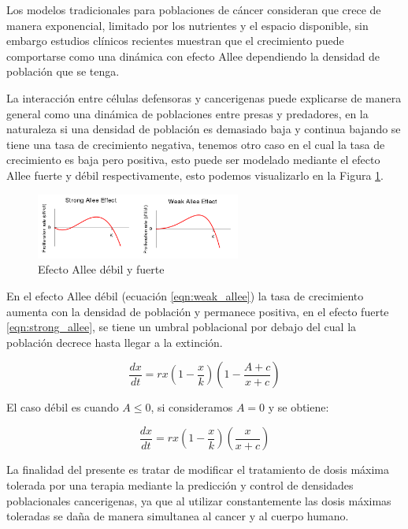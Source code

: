 \documentclass{article}
\begin{document}
Los modelos tradicionales para poblaciones de cáncer consideran que crece de manera exponencial, limitado por los nutrientes y el espacio disponible, sin embargo estudios clínicos recientes muestran que el crecimiento puede comportarse como una dinámica con efecto Allee dependiendo la densidad de población que se tenga\cite{Gerlee032022}.

La interacción entre células defensoras y cancerigenas puede explicarse de manera general como una dinámica de poblaciones entre presas y predadores, en la naturaleza si una densidad de población es demasiado baja y continua bajando se tiene una tasa de crecimiento negativa, tenemos otro caso en el cual la tasa de crecimiento es baja pero positiva, esto puede ser modelado mediante el efecto Allee fuerte y débil respectivamente, esto podemos visualizarlo en la Figura \ref{fig:allees}.


\begin{figure}[ht]
    \centering
    \includegraphics[width=0.6\textwidth]{images/Allee.png}
    \caption{Efecto Allee débil y fuerte}
    \label{fig:allees}
\end{figure}

En el efecto Allee débil (ecuación \ref{eqn:weak_allee}) la tasa de crecimiento aumenta con la densidad de población y permanece positiva, en el efecto fuerte \ref{eqn:strong_allee}, se tiene un umbral poblacional por debajo del cual la población decrece hasta llegar a la extinción.

\begin{equation}
    \frac{d x}{ dt} = r x (1 - \frac{x}{k})(1- \frac{A+ c}{x + c})
    \label{eqn:strong_allee}
\end{equation}

El caso débil es cuando $A\leq 0$, si consideramos $A=0$ y se obtiene:

\begin{equation}
    \frac{d x}{ dt} = r x (1 - \frac{x}{k})(\frac{x}{x + c})
    \label{eqn:weak_allee}
\end{equation}

La finalidad del presente es tratar de modificar el tratamiento de dosis máxima tolerada por una terapia mediante la predicción y control de densidades poblacionales cancerigenas, ya que al utilizar constantemente las dosis máximas toleradas se daña de manera simultanea al cancer y al cuerpo humano.
\end{document}

